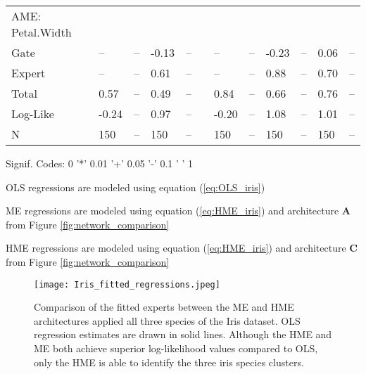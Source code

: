 \documentclass[12pt]{article}
\theoremstyle{definition}
\begin{document}
\begin{landscape}
\begin{table}
\begin{threeparttable}
\begin{tabular}[l]{l l l l l l l l l l l l}
  AME: Petal.Width \\
  \cmidrule(r){1-1}
  Gate               & --   & --     & -0.13 & --        && --    & --     & -0.23 & --     & 0.06  & --           \\
  Expert             & --   & --     &  0.61 & --        && --    & --     &  0.88 & --     & 0.70  & --           \\
  Total              & 0.57 & --     &  0.49 & --        && 0.84  & --     &  0.66 & --     & 0.76  & --           \\[0.3cm]


  Log-Like           & -0.24 & --    & 0.97  & --      && -0.20  & --    & 1.08 & --     & 1.01  & --            \\
  N                  & 150   & --    & 150   & --      && 150    & --    & 150  & --     & 150   & --            \\

	\hline
		\end{tabular}
		\begin{tablenotes}
			\item{\footnotesize Signif. Codes: 0 '*' 0.01 '+' 0.05 '-' 0.1 ' ' 1}
			\item{\footnotesize OLS regressions are modeled using equation (\ref{eq:OLS_iris})}
			\item{\footnotesize ME regressions are modeled using equation (\ref{eq:HME_iris}) and architecture $\boldsymbol{A}$ from Figure \ref{fig:network_comparison}}
			\item{\footnotesize HME regressions are modeled using equation (\ref{eq:HME_iris}) and architecture $\boldsymbol{C}$ from Figure \ref{fig:network_comparison}}
		\end{tablenotes} \label{tbl:Iris}
	\end{threeparttable}
\end{table}
\end{landscape}


\begin{figure}[!ht]
  \texttt{[image: Iris\_fitted\_regressions.jpeg]}
  \caption{Comparison of the fitted experts between the ME and HME architectures
  applied all three species of the Iris dataset. OLS regression estimates are
  drawn in solid lines. Although the HME and ME both achieve superior
  log-likelihood values compared to OLS, only the HME is able to identify the
  three iris species clusters.}
  \label{fig:Iris_fitted_regressions}
\end{figure}
\end{document}
